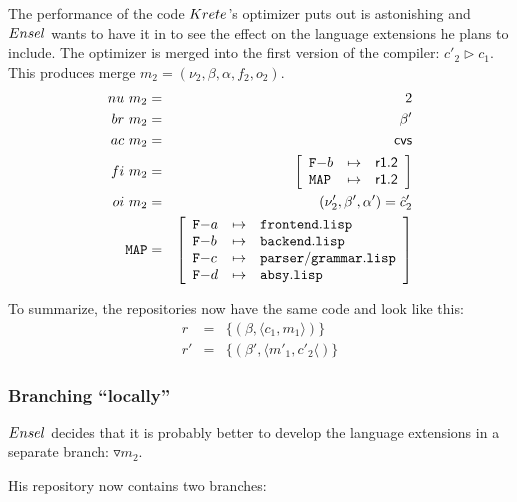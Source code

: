 \documentclass[fleqn, 10pt, a4paper]{report} \usepackage{amssymb}
\begin{document}
The performance of the code $\mathnormal{Krete}$'s optimizer puts out
is astonishing and $\mathnormal{Ensel}$ wants to have it in to see the
effect on the language extensions he plans to include. The optimizer
is merged into the first version of the compiler: $c'_2 \rhd c_1$.
This produces merge $m_2=(\nu_2, \beta, \alpha, f_2, o_2)$.
\begin{eqnarray*}
  \mathnormal{nu}\ m_2 &=& 2 \\
  \mathnormal{br}\ m_2 &=& \beta' \\
  \mathnormal{ac}\ m_2 &=& \mathsf{cvs} \\
  \mathnormal{fi}\ m_2 &=& \left[
    \begin{array}{lcl}
      \mathtt{F-}b & \mapsto & \mathsf{r1.2} \\
      \mathtt{MAP} & \mapsto & \mathsf{r1.2} \\
    \end{array}\right] \\
  \mathnormal{oi}\ m_2 &=& (\nu'_2, \beta', \alpha') = \hat c'_2 \\
  \mathtt{MAP} &=& \left[
    \begin{array}{lcl}
      \mathtt{F-}a &\mapsto& \mathtt{frontend.lisp} \\
      \mathtt{F-}b &\mapsto& \mathtt{backend.lisp} \\
      \mathtt{F-}c &\mapsto& \mathtt{parser/grammar.lisp} \\
      \mathtt{F-}d &\mapsto& \mathtt{absy.lisp} \\
    \end{array}\right]
\end{eqnarray*}

\medskip To summarize, the repositories now have the same code and
look like this:
\begin{eqnarray*}
  r  &=& \{(\beta, \langle c_1, m_1\rangle)\} \\
  r' &=& \{(\beta', \langle m'_1, c'_2\langle)\}
\end{eqnarray*}

\subsubsection{Branching ``locally''}

$\mathnormal{Ensel}$ decides that it is probably better to develop the
language extensions in a separate branch: $\triangledown m_2$.

His repository now contains two branches:
\end{document}
